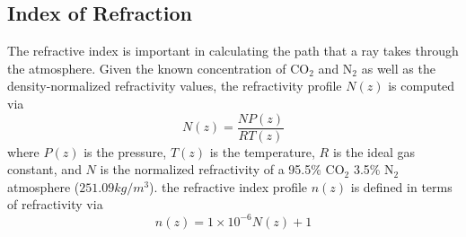 \subsection{Index of Refraction}
The refractive index is important in calculating the path that a ray takes through the atmosphere. Given the known concentration of CO$_2$ and N$_2$ as well as the density-normalized refractivity values, the refractivity profile $N(z)$ is computed via
\begin{equation}
N(z) = \frac{NP(z)}{RT(z)}
\end{equation}
where $P(z)$ is the pressure, $T(z)$ is the temperature, $R$ is the ideal gas constant, and $N$ is the normalized refractivity of a 95.5\% CO$_2$ 3.5\% N$_2$ atmosphere ($251.09 kg/m^3$)\cite{Essen-1951}. the refractive index profile $n(z)$ is defined in terms of refractivity via
\begin{equation}
n(z) = 1 \times 10^{-6} N(z) +1
\end{equation}